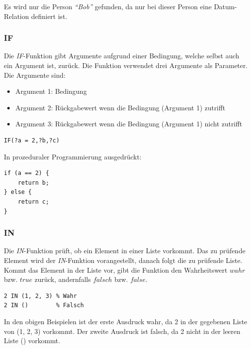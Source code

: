 Es wird nur die Person \textit{``Bob''} gefunden, da nur bei dieser Person eine Datum-Relation definiert ist.

\subsubsection{IF}
\label{ssubsec:sparql_ausdruecke_funktionen_if}
Die \textit{IF}-Funktion gibt Argumente aufgrund einer Bedingung, welche selbst auch ein Argument ist, zurück. Die Funktion verwendet drei Argumente als Parameter. Die Argumente sind:
\begin{itemize}
    \item Argument 1: Bedingung
    \item Argument 2: Rückgabewert wenn die Bedingung (Argument 1) zutrifft
    \item Argument 3: Rückgabewert wenn die Bedingung (Argument 1) nicht zutrifft
\end{itemize}

\begin{lstlisting}
IF(?a = 2,?b,?c)
\end{lstlisting}

In prozeduraler Programmierung ausgedrückt:
\begin{lstlisting}
if (a == 2) {
    return b;
} else {
    return c;
}
\end{lstlisting}

\subsubsection{IN}
\label{subsec:sparql_ausdruecke_funktionen_in}
Die \textit{IN}-Funktion prüft, ob ein Element in einer Liste vorkommt. Das zu prüfende Element wird der \textit{IN}-Funktion vorangestellt, danach folgt die zu prüfende Liste. Kommt das Element in der Liste vor, gibt die Funktion den Wahrheitswert $wahr$ bzw. $true$ zurück, andernfalls $falsch$ bzw. $false$.

\begin{lstlisting}
2 IN (1, 2, 3) % Wahr
2 IN ()        % Falsch
\end{lstlisting}
In den obigen Beispielen ist der erste Ausdruck wahr, da 2 in der gegebenen Liste von (1, 2, 3) vorkommt. Der zweite Ausdruck ist falsch, da 2 nicht in der leeren Liste () vorkommt.

